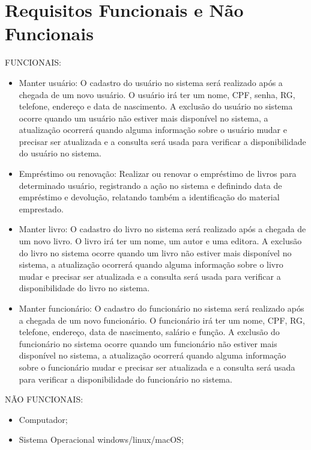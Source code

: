 \chapter{Requisitos Funcionais e Não Funcionais}

FUNCIONAIS:

\begin{itemize}
   \item Manter usuário: O cadastro do usuário no sistema será realizado após a chegada de um novo usuário. O usuário irá ter um nome, CPF, senha, RG, telefone, endereço e data de nascimento. A exclusão do usuário no sistema ocorre quando um usuário não estiver mais disponível no sistema, a atualização ocorrerá quando alguma informação sobre o usuário mudar  e precisar ser atualizada e a   consulta será usada para verificar a disponibilidade do usuário no sistema.
   \item Empréstimo ou renovação: Realizar ou renovar o empréstimo de livros para determinado usuário, registrando a ação no sistema e definindo data de empréstimo e devolução, relatando também a identificação do material emprestado.
   \item Manter livro: O cadastro do livro no sistema será realizado após a chegada de um novo livro. O livro irá ter um nome, um autor e uma editora. A exclusão do livro no sistema ocorre quando um livro não estiver mais disponível no sistema, a atualização ocorrerá quando alguma informação sobre o livro mudar  e precisar ser atualizada e a   consulta será usada para verificar a disponibilidade do livro no sistema. 
   \item Manter funcionário: O cadastro do funcionário no sistema será realizado após a chegada de um novo funcionário.  O funcionário irá ter um nome, CPF, RG, telefone, endereço, data de nascimento, salário e função. A exclusão do funcionário no sistema ocorre quando um funcionário não estiver mais disponível no sistema, a atualização ocorrerá quando alguma informação sobre o funcionário mudar  e precisar ser atualizada e a   consulta será usada para verificar a disponibilidade do funcionário no sistema.
\end{itemize}

\newpage
NÃO FUNCIONAIS:

\begin{itemize}
   \item Computador;
   \item Sistema Operacional windows/linux/macOS;
\end{itemize}